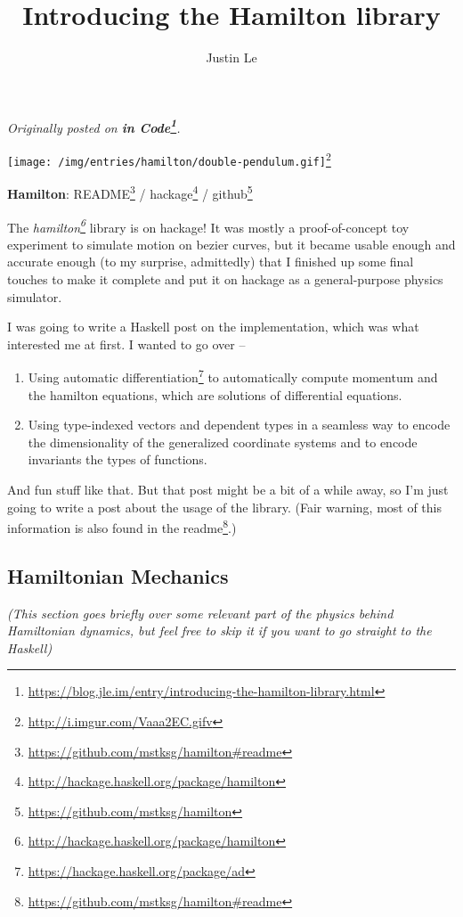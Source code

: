 \documentclass[]{article}
\title{Introducing the Hamilton library}
\author{Justin Le}
\renewcommand{\href}[2]{#2\footnote{\url{#1}}}
\begin{document}
\maketitle

\emph{Originally posted on
\textbf{\href{https://blog.jle.im/entry/introducing-the-hamilton-library.html}{in
Code}}.}

\href{http://i.imgur.com/Vaaa2EC.gifv}{\texttt{[image: /img/entries/hamilton/double-pendulum.gif]}}

\textbf{Hamilton}: \href{https://github.com/mstksg/hamilton\#readme}{README} /
\href{http://hackage.haskell.org/package/hamilton}{hackage} /
\href{https://github.com/mstksg/hamilton}{github}

The \emph{\href{http://hackage.haskell.org/package/hamilton}{hamilton}} library
is on hackage! It was mostly a proof-of-concept toy experiment to simulate
motion on bezier curves, but it became usable enough and accurate enough (to my
surprise, admittedly) that I finished up some final touches to make it complete
and put it on hackage as a general-purpose physics simulator.

I was going to write a Haskell post on the implementation, which was what
interested me at first. I wanted to go over --

\begin{enumerate}
\def\labelenumi{\arabic{enumi}.}
\item
  Using \href{https://hackage.haskell.org/package/ad}{automatic differentiation}
  to automatically compute momentum and the hamilton equations, which are
  solutions of differential equations.
\item
  Using type-indexed vectors and dependent types in a seamless way to encode the
  dimensionality of the generalized coordinate systems and to encode invariants
  the types of functions.
\end{enumerate}

And fun stuff like that. But that post might be a bit of a while away, so I'm
just going to write a post about the usage of the library. (Fair warning, most
of this information is also found in the
\href{https://github.com/mstksg/hamilton\#readme}{readme}.)

\subsection{Hamiltonian Mechanics}\label{hamiltonian-mechanics}

\emph{(This section goes briefly over some relevant part of the physics behind
Hamiltonian dynamics, but feel free to skip it if you want to go straight to the
Haskell)}
\end{document}
